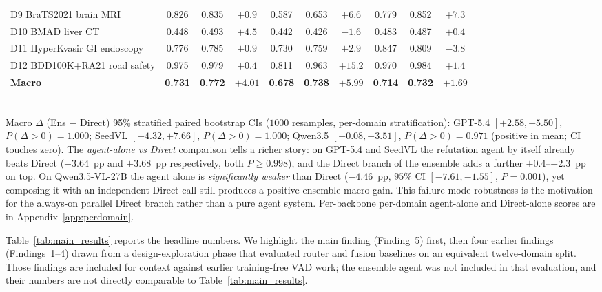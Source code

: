 \begin{table}[t]
\begin{tabular}{l|ccc|ccc|ccc}
D9  BraTS2021 brain MRI       & 0.826 & 0.835 & $+0.9$ & 0.587 & 0.653 & $+6.6$ & 0.779 & 0.852 & $+7.3$ \\
D10 BMAD liver CT             & 0.448 & 0.493 & $+4.5$ & 0.442 & 0.426 & $-1.6$ & 0.483 & 0.487 & $+0.4$ \\
D11 HyperKvasir GI endoscopy  & 0.776 & 0.785 & $+0.9$ & 0.730 & 0.759 & $+2.9$ & 0.847 & 0.809 & $-3.8$ \\
D12 BDD100K+RA21 road safety  & 0.975 & 0.979 & $+0.4$ & 0.811 & 0.963 & $+15.2$& 0.970 & 0.984 & $+1.4$ \\
\midrule
\textbf{Macro}                & \textbf{0.731} & \textbf{0.772} & $\mathbf{+4.01}$ & \textbf{0.678} & \textbf{0.738} & $\mathbf{+5.99}$ & \textbf{0.714} & \textbf{0.732} & $\mathbf{+1.69}$ \\
\bottomrule
\end{tabular}
\\[3pt]
{\footnotesize Macro $\Delta$ (Ens $-$ Direct) 95\% stratified paired bootstrap CIs ($1000$ resamples, per-domain stratification):
GPT-5.4 $[+2.58, +5.50]$, $P(\Delta\!>\!0){=}1.000$;\;
SeedVL $[+4.32, +7.66]$, $P(\Delta\!>\!0){=}1.000$;\;
Qwen3.5 $[-0.08, +3.51]$, $P(\Delta\!>\!0){=}0.971$ (positive in mean; CI touches zero).
The \emph{agent-alone vs Direct} comparison tells a richer story: on GPT-5.4 and SeedVL the refutation agent by itself already beats Direct ($+3.64$~pp and $+3.68$~pp respectively, both $P{\ge}0.998$), and the Direct branch of the ensemble adds a further $+0.4$--$+2.3$~pp on top. On Qwen3.5-VL-27B the agent alone is \emph{significantly weaker} than Direct ($-4.46$~pp, $95\%$ CI $[-7.61, -1.55]$, $P{=}0.001$), yet composing it with an independent Direct call still produces a positive ensemble macro gain. This failure-mode robustness is the motivation for the always-on parallel Direct branch rather than a pure agent system. Per-backbone per-domain agent-alone and Direct-alone scores are in Appendix~\ref{app:perdomain}.}
\end{table}


Table~\ref{tab:main_results} reports the headline numbers. We highlight the main finding (Finding~5) first, then four earlier findings (Findings~1--4) drawn from a design-exploration phase that evaluated router and fusion baselines on an equivalent twelve-domain split. Those findings are included for context against earlier training-free VAD work; the ensemble agent was not included in that evaluation, and their numbers are not directly comparable to Table~\ref{tab:main_results}.

